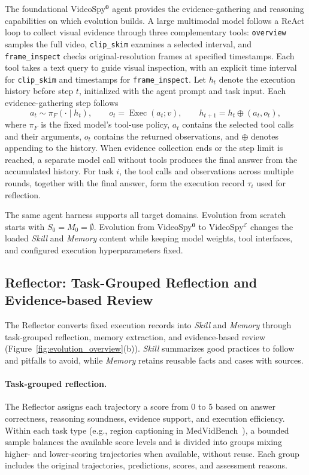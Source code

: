 \documentclass{article} %
\begin{document}
The foundational VideoSpy$^{\mathbf{0}}$ agent provides the evidence-gathering and reasoning capabilities on which evolution builds. A large multimodal model follows a ReAct loop to collect visual evidence through three complementary tools: \texttt{overview} samples the full video, \texttt{clip\_skim} examines a selected interval, and \texttt{frame\_inspect} checks original-resolution frames at specified timestamps. Each tool takes a text query to guide visual inspection, with an explicit time interval for \texttt{clip\_skim} and timestamps for \texttt{frame\_inspect}. Let $h_t$ denote the execution history before step $t$, initialized with the agent prompt and task input. Each evidence-gathering step follows
\begin{equation}
a_t \sim \pi_F(\cdot\mid h_t), \qquad
o_t=\operatorname{Exec}(a_t;v), \qquad
h_{t+1}=h_t\oplus(a_t,o_t),
\end{equation}
where $\pi_F$ is the fixed model's tool-use policy, $a_t$ contains the selected tool calls and their arguments, $o_t$ contains the returned observations, and $\oplus$ denotes appending to the history. When evidence collection ends or the step limit is reached, a separate model call without tools produces the final answer from the accumulated history. For task $i$, the tool calls and observations across multiple rounds, together with the final answer, form the execution record $\tau_i$ used for reflection.

The same agent harness supports all target domains. Evolution from scratch starts with $S_0=M_0=\emptyset$. Evolution from VideoSpy$^{\mathbf{0}}$ to VideoSpy$^{\mathcal{E}}$ changes the loaded \textit{Skill} and \textit{Memory} content while keeping model weights, tool interfaces, and configured execution hyperparameters fixed.

\subsection{Reflector: Task-Grouped Reflection and Evidence-based Review}
\label{sec:reflector}

The Reflector converts fixed execution records into \textit{Skill} and \textit{Memory} through task-grouped reflection, memory extraction, and evidence-based review (Figure~\ref{fig:evolution_overview}(b)). \textit{Skill} summarizes good practices to follow and pitfalls to avoid, while \textit{Memory} retains reusable facts and cases with sources.

\paragraph{Task-grouped reflection.}
The Reflector assigns each trajectory a score from 0 to 5 based on answer correctness, reasoning soundness, evidence support, and execution efficiency.
Within each task type (e.g., region captioning in MedVidBench~\citep{su2026medgrpo}), a bounded sample balances the available score levels and is divided into groups mixing higher- and lower-scoring trajectories when available, without reuse. Each group includes the original trajectories, predictions, scores, and assessment reasons.
\end{document}
